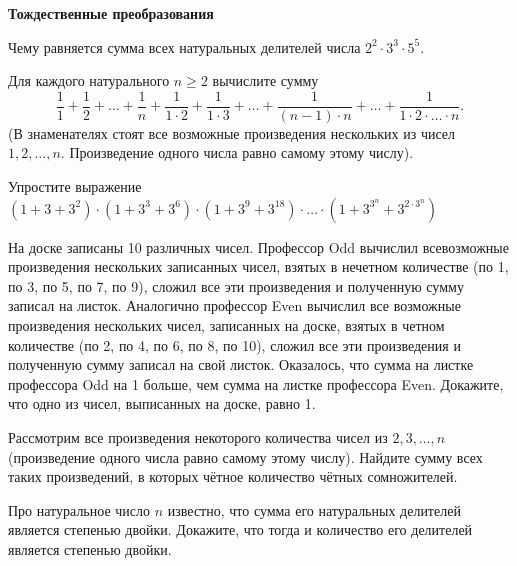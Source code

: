 \documentclass{article}
\begin{document}
    \large

    \begin{center}
        \textbf{Тождественные преобразования}
    \end{center}

    \begin{enumerate_boxed}

        \item Чему равняется сумма всех натуральных делителей числа $2^2 \cdot 3^3 \cdot 5^5.$

        \item Для каждого натурального $n \ge 2$ вычислите сумму
        \[
            \dfrac{1}{1} + \dfrac{1}{2} + \dotsc +  \dfrac{1}{n} + \dfrac{1}{1 \cdot 2} + \dfrac{1}{1 \cdot 3} + \dotso +  \dfrac{1}{(n-1) \cdot n} + \dotso + \dfrac{1}{1 \cdot 2 \cdot \dotso \cdot n}.
        \]
        (В знаменателях стоят все возможные произведения нескольких из чисел $1, 2, \dotsc, n$.
        Произведение одного числа равно самому этому числу).

        \item Упростите выражение $(1+3+3^2)\cdot (1+3^3 +3^6)\cdot (1+3^9 +3^{18})\cdot \dotsc \cdot  (1+3^{3^n} +3^{2\cdot 3^n})$

        \item На доске записаны 10 различных чисел.
        Профессор Odd вычислил всевозможные произведения нескольких записанных чисел, взятых в нечетном количестве (по 1, по 3, по 5, по 7, по 9), сложил все эти произведения и полученную сумму записал на листок.
        Аналогично профессор Even вычислил все возможные произведения нескольких чисел, записанных на доске, взятых в четном количестве (по 2, по 4, по 6, по 8, по 10), сложил все эти произведения и полученную сумму записал на свой листок.
        Оказалось, что сумма на листке профессора Odd на 1 больше, чем сумма на листке профессора Even.
        Докажите, что одно из чисел, выписанных на доске, равно 1.

        \item Рассмотрим все произведения некоторого количества чисел из $2, 3, \dotsc, n$ (произведение одного числа равно самому этому числу).
        Найдите сумму всех таких произведений, в которых чётное количество чётных сомножителей.

        \item Про натуральное число $n$ известно, что сумма его натуральных делителей является степенью двойки.
        Докажите, что тогда и количество его делителей является степенью двойки.

    \end{enumerate_boxed}
\end{document}
